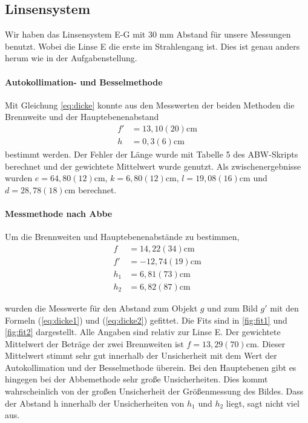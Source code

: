 \documentclass[11pt, a4paper]{article}
\begin{document}
    \subsection{Linsensystem}
    Wir haben das Linsensystem E-G mit $30$ mm Abstand für unsere Messungen benutzt. Wobei die Linse E die erste im Strahlengang ist. Dies ist genau anders herum wie in der Aufgabenstellung.

    \paragraph{Autokollimation- und Besselmethode}
    Mit Gleichung \ref{eq:dicke} konnte aus den Messwerten der beiden Methoden die Brennweite und der Hauptebenenabstand
    \begin{align}
        f' &= 13,10(20) \si{\centi\metre} \\
        h &= 0,3(6) \si{\centi\metre}
    \end{align}
    bestimmt werden. Der Fehler der Länge wurde mit Tabelle 5 des ABW-Skripts \cite{ABW} berechnet und der gewichtete Mittelwert wurde genutzt. Als zwischenergebnisse wurden $e = 64,80(12) \si{\centi\metre}$, $k = 6,80(12) \si{\centi\metre}$, $l = 19,08(16) \si{\centi\metre}$ und $d = 28,78(18) \si{\centi\metre}$ berechnet.

    \paragraph{Messmethode nach Abbe}
    Um die Brennweiten und Hauptebenenabstände zu bestimmen,
    \begin{align}
        f &= 14,22(34) \si{\centi\metre} \\
        f' &= -12,74(19) \si{\centi\metre} \\
        h_1 &= 6,81(73) \si{\centi\metre} \\
        h_2 &= 6,82(87) \si{\centi\metre}
    \end{align}
    
    wurden die Messwerte für den Abstand zum Objekt $g$ und zum Bild $g'$ mit den Formeln (\ref{eq:dicke1}) und (\ref{eq:dicke2}) gefittet. Die Fits sind in \ref{fig:fit1} und \ref{fig:fit2} dargestellt. Alle Angaben sind relativ zur Linse E. Der gewichtete Mittelwert der Beträge der zwei Brennweiten ist $f = 13,29(70) \si{\centi\metre}$. Dieser Mittelwert stimmt sehr gut innerhalb der Unsicherheit mit dem Wert der Autokollimation und der Besselmethode überein. Bei den Hauptebenen gibt es hingegen bei der Abbemethode sehr große Unsicherheiten. Dies kommt wahrscheinlich von der großen Unsicherheit der Größenmessung des Bildes. Dass der Abstand h innerhalb der Unsicherheiten von $h_1$ und $h_2$ liegt, sagt nicht viel aus.
\end{document}
